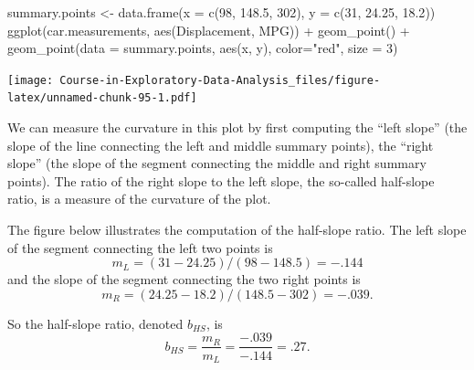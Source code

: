 \documentclass[
]{book}
\newenvironment{Shaded}{\begin{snugshade}}{\end{snugshade}}
\newcommand{\AttributeTok}[1]{\textcolor[rgb]{0.77,0.63,0.00}{#1}}
\newcommand{\DecValTok}[1]{\textcolor[rgb]{0.00,0.00,0.81}{#1}}
\newcommand{\FloatTok}[1]{\textcolor[rgb]{0.00,0.00,0.81}{#1}}
\newcommand{\FunctionTok}[1]{\textcolor[rgb]{0.00,0.00,0.00}{#1}}
\newcommand{\NormalTok}[1]{#1}
\newcommand{\OtherTok}[1]{\textcolor[rgb]{0.56,0.35,0.01}{#1}}
\newcommand{\SpecialCharTok}[1]{\textcolor[rgb]{0.00,0.00,0.00}{#1}}
\newcommand{\StringTok}[1]{\textcolor[rgb]{0.31,0.60,0.02}{#1}}
\begin{document}
\begin{Shaded}
\begin{Highlighting}[]
\NormalTok{summary.points }\OtherTok{\textless{}{-}} \FunctionTok{data.frame}\NormalTok{(}\AttributeTok{x =} \FunctionTok{c}\NormalTok{(}\DecValTok{98}\NormalTok{, }\FloatTok{148.5}\NormalTok{, }\DecValTok{302}\NormalTok{),}
                             \AttributeTok{y =} \FunctionTok{c}\NormalTok{(}\DecValTok{31}\NormalTok{, }\FloatTok{24.25}\NormalTok{, }\FloatTok{18.2}\NormalTok{))}
\FunctionTok{ggplot}\NormalTok{(car.measurements,}
       \FunctionTok{aes}\NormalTok{(Displacement, MPG)) }\SpecialCharTok{+}
  \FunctionTok{geom\_point}\NormalTok{() }\SpecialCharTok{+}
  \FunctionTok{geom\_point}\NormalTok{(}\AttributeTok{data =}\NormalTok{ summary.points,}
              \FunctionTok{aes}\NormalTok{(x, y), }\AttributeTok{color=}\StringTok{"red"}\NormalTok{, }\AttributeTok{size =} \DecValTok{3}\NormalTok{)}
\end{Highlighting}
\end{Shaded}

\texttt{[image: Course-in-Exploratory-Data-Analysis\_files/figure-latex/unnamed-chunk-95-1.pdf]}

We can measure the curvature in this plot by first computing the ``left slope'' (the slope of the line connecting the left and middle summary points), the ``right slope'' (the slope of the segment connecting the middle and right summary points). The ratio of the right slope to the left slope, the so-called half-slope ratio, is a measure of the curvature of the plot.

The figure below illustrates the computation of the half-slope ratio. The left slope of the segment connecting the left two points is
\[
m_L = (31-24.25)/(98-148.5) = -.144
\]
and the slope of the segment connecting the two right points is
\[
m_R = (24.25-18.2)/(148.5-302) = -.039.
\]

So the half-slope ratio, denoted \(b_{HS}\), is
\[
b_{HS} = \frac{m_R}{m_L} = \frac{-.039}{-.144} = .27.
\]
\end{document}
